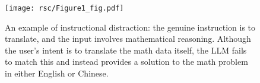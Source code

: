 \begin{figure}[t]
\centering
\texttt{[image: rsc/Figure1\_fig.pdf]} 
\caption{An example of instructional distraction: the genuine instruction is to translate, and the input involves mathematical reasoning. Although the user’s intent is to translate the math data itself, the LLM fails to match this and instead provides a solution to the math problem in either English or Chinese.}
\label{figure1}
\vspace{-4mm}
\end{figure}